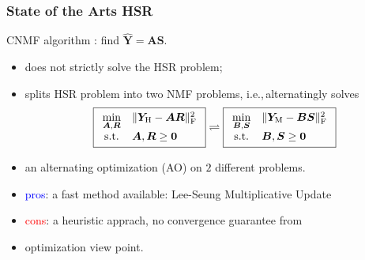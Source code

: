 \documentclass[10pt,mathserif]{beamer}
\newcommand{\YH}{\bm Y_\text H}
\newcommand{\YM}{\bm Y_\text M}
\newcommand{\Fr}{_\text F}
\newcommand{\ie}{i.e.,\,}
\begin{document}
    \begin{frame} \label{fr:SOAs}
        \frametitle{State of the Arts HSR}
        CNMF algorithm \cite{CNMF}: find $\hat{\bm Y} = \bm A \bm S$.
        \begin{itemize}
            \item does not strictly solve the HSR problem;
            \item splits HSR problem into two NMF problems,
                  \ie alternatingly solves \newline
                  \[
                   \boxed{
                       \begin{array}{cl}
                           \underset{\bm A,\bm R}{\min}
                           &
                           \Vert \YH - \bm A \bm R \Vert\Fr^2 \\
                           \text{s.t.}
                           &
                           \bm A, \bm R \geq \bm 0
                       \end{array}
                   }
                  \rightleftharpoons
                  \boxed{
                       \begin{array}{cl}
                           \underset{\bm B,\bm S}{\min}
                           &
                           \Vert \YM - \bm B \bm S \Vert\Fr^2 \\
                           \text{s.t.}
                           &
                           \bm B, \bm S \geq \bm 0
                       \end{array}
                   }
                  \]
            \item an alternating optimization (AO) on $2$ different problems.
            \item \textcolor{blue}{pros}: a fast method available: Lee-Seung
                  Multiplicative Update \cite{LSMU_NATURE1999} \hyperlink{fr:LSMU}{}
            \item \textcolor{red}{cons}: a heuristic apprach, no convergence guarantee from
            \item[]\hspace{0.8cm} optimization view point.
        \end{itemize}
    \end{frame}
\end{document}
